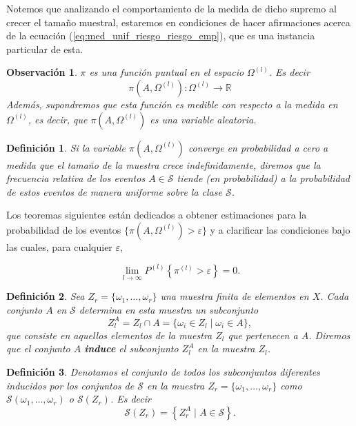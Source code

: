 \documentclass{report}
\newtheorem{dfn}{Definición}[section]
\newtheorem{obs}{Observación}[section]
\begin{document}
Notemos que analizando el comportamiento de la medida de dicho supremo al crecer el tamaño muestral, 
estaremos en condiciones de hacer afirmaciones acerca de la ecuación (\ref{eq:med_unif_riesgo_riesgo_emp}),
que es una instancia particular de esta.\newline

\begin{obs}
$\pi$ es una función puntual en el espacio \( \Omega^{(l)} \). Es decir
\[ \pi(A, \Omega^{(l)}): \Omega^{(l)} \rightarrow \mathbb{R}
\]
Además, supondremos que esta función es medible con respecto a la medida en \( \Omega^{(l)} \), 
es decir, que \( \pi(A, \Omega^{(l)}) \) es una variable aleatoria.
\end{obs} 
\begin{dfn}
Si la variable \( \pi(A, \Omega^{(l)}) \) converge en probabilidad a cero a medida que 
el tamaño de la muestra crece indefinidamente, diremos que la frecuencia relativa 
de los eventos \( A \in \mathcal{S} \) tiende (en probabilidad) a la probabilidad 
de estos eventos de manera \emph{uniforme} sobre la clase \( \mathcal{S} \).
\end{dfn}


Los teoremas siguientes están dedicados a obtener estimaciones para la probabilidad 
de los eventos \( \{ \pi(A, \Omega^{(l)}) > \varepsilon \} \) y a clarificar las condiciones 
bajo las cuales, para cualquier \( \varepsilon \),

\[
\lim_{l \to \infty} P^{(l)}\left\{\pi^{(l)} > \varepsilon\right\} = 0.
\]
\bigskip


\begin{dfn}
Sea \( Z_r = \{\omega_1, \dots, \omega_r\} \) una muestra finita de elementos en \( X \). 
Cada conjunto \( A \) en \( \mathcal{S} \) determina en esta muestra un subconjunto 
\[ 
    Z_l^A = Z_l \cap A = \{\omega_i \in Z_l \mid \omega_i \in A\}, 
\]
que consiste en aquellos elementos de la 
muestra \( Z_l \) que pertenecen a \( A \). Diremos que el conjunto \( A \) \textbf{induce} 
el subconjunto \( Z_l^A  \) en la muestra \( Z_l \).
\end{dfn}
\bigskip

\begin{dfn}
Denotamos el conjunto de todos los subconjuntos diferentes inducidos por los 
conjuntos de \( \mathcal{S} \) en la muestra \( Z_r = \{\omega_1, \dots, \omega_r\} \) como \( \mathcal{S}(\omega_1, \dots, \omega_r) \) 
o \( \mathcal{S}(Z_r) \). Es decir
\[
    \mathcal{S}(Z_r) =  \left\{Z_r^A \mid A \in \mathcal{S}\right\}.
\]
\end{dfn}
\bigskip
\end{document}
